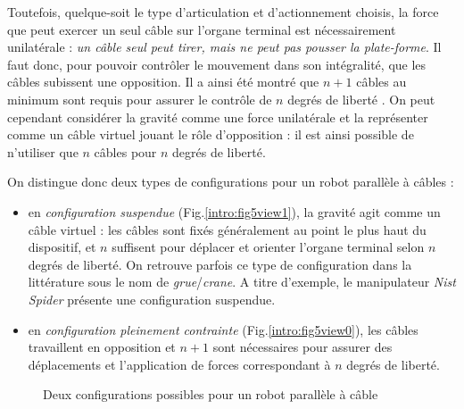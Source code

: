 Toutefois, quelque-soit le type d'articulation et d'actionnement choisis, la 
force que peut exercer un seul câble sur l'organe terminal est nécessairement 
unilatérale : {\em un câble seul peut tirer, mais ne peut pas pousser la 
plate-forme}. Il faut donc, pour pouvoir contrôler le mouvement dans son 
intégralité, que les câbles subissent une opposition. Il a ainsi été montré que 
$n+1$ câbles au minimum sont requis pour assurer le contrôle de $n$ degrés de 
liberté \cite{1994:Ming.Higuchi}. On peut cependant considérer la gravité comme 
une force unilatérale et la représenter comme un câble virtuel jouant le rôle 
d'opposition : il est ainsi possible de n'utiliser que $n$ câbles pour $n$ 
degrés de liberté.

On distingue donc deux types de configurations pour un robot parallèle à câbles 
:
\begin{itemize}
 \item en {\it configuration suspendue} (Fig.\ref{intro:fig5view1}), la gravité 
agit comme un câble virtuel : les câbles sont fixés généralement au point le 
plus haut du dispositif, et $n$ suffisent pour déplacer et orienter l'organe 
terminal selon $n$ degrés de liberté. On retrouve parfois ce type de 
configuration dans la littérature sous le nom de {\it grue}/{\it crane}. A 
titre d'exemple, le manipulateur {\it Nist Spider} 
\cite{1992:Albus.Bostelman.ea} présente une configuration suspendue.
 \item en {\it configuration pleinement contrainte} (Fig.\ref{intro:fig5view0}), 
les câbles travaillent en opposition et $n+1$ sont nécessaires pour assurer des 
déplacements et l'application de forces correspondant à $n$ degrés de liberté.
\end{itemize}

\begin{figure}[!ht]
  \centering
\hfill
    \caption{\footnotesize Deux configurations possibles pour un robot parallèle 
à câble}
\label{intro:fig5}
\end{figure}

